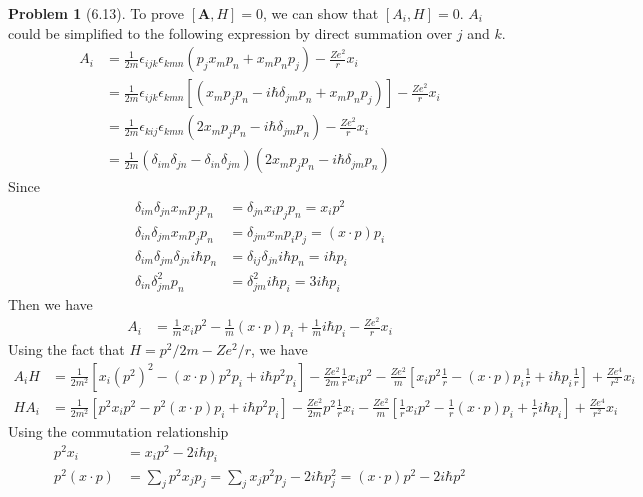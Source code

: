 \documentclass[twoside,11pt]{article}
\theoremstyle{definition}
\newtheorem{problem}{Problem}
\theoremstyle{remark}
\begin{document}
\begin{problem}[6.13]
To prove $[\mathbf{A}, H]=0$, we can show that $[A_i,H]=0$.
$A_i$ could be simplified to the following expression by direct summation
over $j$ and $k$.
\begin{align*}
    A_i &= \frac{1}{2m}\epsilon_{ijk}\epsilon_{kmn}
    (p_jx_mp_n+x_mp_np_j) - \frac{Ze^2}{r}x_i\\
    &= \frac{1}{2m}\epsilon_{ijk}\epsilon_{kmn}
    [(x_mp_jp_n - i\hbar\delta_{jm}p_n + x_mp_np_j)] - \frac{Ze^2}{r}x_i\\
    &= \frac{1}{2m}\epsilon_{kij}\epsilon_{kmn}
    (2x_mp_jp_n - i\hbar\delta_{jm}p_n) - \frac{Ze^2}{r}x_i\\
    &= \frac{1}{2m}(\delta_{im}\delta_{jn} - \delta_{in}\delta_{jm})
    (2x_mp_jp_n - i\hbar\delta_{jm}p_n)
\end{align*}
Since
\begin{align*}
    \delta_{im}\delta_{jn}x_mp_jp_n &= \delta_{jn}x_ip_jp_n = x_ip^2\\
    \delta_{in}\delta_{jm}x_mp_jp_n &= \delta_{jm}x_mp_ip_j = (x\cdot p)p_i\\
    \delta_{im}\delta_{jm}\delta_{jn}i\hbar p_n&= 
    \delta_{ij}\delta_{jn}i\hbar p_n = i\hbar p_i\\
    \delta_{in}\delta_{jm}^2p_n &= \delta_{jm}^2 i\hbar p_i = 3i\hbar p_i
\end{align*}
Then we have 
\begin{align*}
    A_i &= \frac{1}{m}x_ip^2 - \frac{1}{m}(x\cdot p)p_i
    + \frac{1}{m}i\hbar p_i - \frac{Ze^2}{r}x_i
\end{align*}
Using the fact that $H=p^2/2m - Ze^2/r$, we have
\begin{align*}
    A_iH &=
    \frac{1}{2m^2}[x_i(p^2)^2 - (x\cdot p) p^2p_i + i\hbar p^2p_i]
    -\frac{Ze^2}{2m}\frac{1}{r}x_ip^2 - 
    \frac{Ze^2}{m}[x_ip^2\frac{1}{r} - (x\cdot p)p_i\frac{1}{r}
    +i\hbar p_i\frac{1}{r}]
    + \frac{Ze^4}{r^2}x_i\\
    HA_i &= 
    \frac{1}{2m^2}[p^2x_ip^2 - p^2(x\cdot p)p_i + i\hbar p^2p_i]
    -\frac{Ze^2}{2m}p^2\frac{1}{r}x_i 
     - \frac{Ze^2}{m}[\frac{1}{r}x_ip^2 - \frac{1}{r}(x\cdot p)p_i + 
    \frac{1}{r}i\hbar p_i]
    + \frac{Ze^4}{r^2}x_i
\end{align*}
Using the commutation relationship
\begin{align*}
    p^2 x_i &= x_ip^2 - 2i\hbar p_i\\
    p^2(x\cdot p) &= \sum_j p^2x_jp_j 
    = \sum_j x_jp^2p_j - 2i\hbar p_j^2= 
    (x\cdot p)p^2 - 2i\hbar p^2
\end{align*}

\end{problem}
\end{document}
